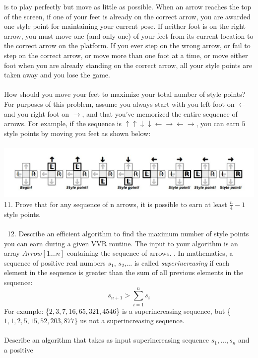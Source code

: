 \documentclass[12pt]{article}
\newcommand\blankpage{%
    \null
    \thispagestyle{empty}%
    \addtocounter{page}{-1}%
    \newpage}
\begin{document}
is to play perfectly but move as little as possible. When an arrow reaches the top of the
screen, if one of your feet is already on the correct arrow, you are awarded one style point
for maintaining your current pose. If neither foot is on the right arrow, you must move one
(and only one) of your feet from its current location to the correct arrow on the platform.
If you ever step on the wrong arrow, or fail to step on the correct arrow, or move more
than one foot at a time, or move either foot when you are already standing on the correct
arrow, all your style points are taken away and you lose the game.\\\\
How should you move your feet to maximize your total number of style points? For
purposes of this problem, assume you always start with you left foot on $\leftarrow$
and you right
foot on $\rightarrow$, and that you’ve memorized the entire sequence of arrows. For example, if the
sequence is $\uparrow\uparrow\downarrow\downarrow\leftarrow\rightarrow\leftarrow\rightarrow$, you can earn $5$ style points by moving you feet as shown
below:\\\\
\includegraphics[width=\textwidth]{ddr.jpg}\\
11. Prove that for any sequence of n arrows, it is possible to earn at least $\frac{n}{4} - 1$ style
points.\\\\\
12. Describe an efficient algorithm to find the maximum number of style points you can
earn during a given VVR routine. The input to your algorithm is an array $Arrow[1 \dots n]$
containing the sequence of arrows.
\afterpage{\blankpage}
\newpage
{}. In mathematics, a sequence of positive real numbers 
$s_1$, $s_2$,$\dots$ is called \textit{superincreasing} if each element
in the sequence is greater than the sum of all previous elements in the sequence:
$$s_{n+1} > \sum\limits_{i=1}^{n}s_i$$
For example: \{$2,3,7,16,65,321,4546$\} is a superincreasing sequence, 
but \{$1,1,2,5,15,52,203,877$\} us not a superincreasing sequence.\\\\
Describe an algorithm that takes as input superincreasing sequence $s_1,\dots,s_n$ and a positive 
\end{document}
